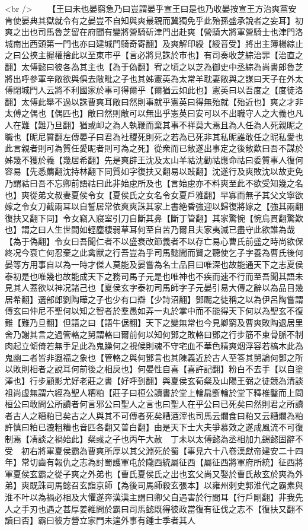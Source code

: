 <br />
　　【王曰未也晏窮急乃曰豈謂晏乎宣王曰是也乃收晏按宣王方治爽黨安肯使晏典其獄就令有之晏豈不自知與爽最親而冀獨免乎此殆孫盛承說者之妄耳】初爽之出也司馬魯芝留在府聞有變將營騎斫津門出赴爽【營騎大將軍營騎士也津門洛城南出西頭第一門也亦曰建城門騎奇寄翻】及爽解印綬【綬音受】將出主簿楊綜止之曰公挾主握權捨此以至東市乎【言必將見誅於市也】有司奏收芝綜治罪【治直之翻】太傅懿曰彼各為其主也【為于偽翻】宥之頃之以芝為御史中丞綜為尚書郎魯芝將出呼參軍辛敞欲與俱去敞毗之子也其姊憲英為太常羊耽妻敞與之謀曰天子在外太傅閉城門人云將不利國家於事可得爾乎【爾猶云如此也】憲英曰以吾度之【度徒洛翻】太傅此舉不過以誅曹爽耳敞曰然則事就乎憲英曰得無殆就【殆近也】爽之才非太傅之偶也【偶匹也】敞曰然則敞可以無出乎憲英曰安可以不出職守人之大義也凡人在難【難乃旦翻】猶或卹之為人執鞭而棄其事不祥莫大焉且為人任為人死親昵之職也【昵尼質翻左傳晏子曰君為社稷死則死之若為已死非其私昵誰敢任之昵私愛也此言親者則可為質任愛昵者則可為之死】從衆而已敞遂出事定之後敞歎曰吾不謀於姊幾不獲於義【幾居希翻】先是爽辟王沈及太山羊祜沈勸祜應命祜曰委質事人復何容易【先悉薦翻沈持林翻下同質如字復扶又翻易以䜴翻】沈遂行及爽敗沈以故吏免乃謂祜曰吾不忘卿前語祜曰此非始慮所及也【言始慮亦不料爽至此不欲受知幾之名也】爽從弟文叔妻夏侯令女【夏侯氏之女名令女夏戶雅翻】早寡而無子其父文寧欲嫁之令女刀截兩耳以自誓居常依爽爽誅其家上書絶昏強迎以歸復將嫁之【強其兩翻復扶又翻下同】令女竊入寢室引刀自斷其鼻【斷丁管翻】其家驚惋【惋烏貫翻驚歎也】謂之曰人生世間如輕塵棲弱草耳何至自苦乃爾且夫家夷滅已盡守此欲誰為哉【為于偽翻】令女曰吾聞仁者不以盛衰改節義者不以存亡易心曹氏前盛之時尚欲保終况今衰亡何忍棄之此禽獸之行吾豈為乎司馬懿聞而賢之聽使乞子字養為曹氏後何晏等方用事自以為一時才傑人莫能及晏嘗為名士品目曰唯深也故能通天下之志夏侯泰初是也唯幾也故能成天下之務司馬子元是也唯神也不疾而速不行而至吾聞其語未見其人蓋欲以神况諸己也【夏侯玄字泰初司馬師字子元晏引易大傳之辭以為品目幾居希翻】選部郎劉陶曄之子也少有口辯【少詩沼翻】鄧颺之徒稱之以為伊呂陶嘗謂傳玄曰仲尼不聖何以知之智者於羣愚如弄一丸於掌中而不能得天下何以為聖玄不復難【難乃旦翻】但語之曰【語牛倨翻】天下之變無常也今見卿窮及曹爽敗陶退居里舍乃謝其言之過管輅之舅謂輅曰爾前何以知何鄧之敗輅曰鄧之行步筋不束骨脈不制肉起立傾倚若無手足此為鬼躁何之視候則魂不守宅血不華色精爽烟浮容若槁木此為鬼幽二者皆非遐福之象也【管輅之與何鄧言也其陳義近於古人至答其舅論何鄧之所以敗則相者之說耳何前後之相戾也】何晏性自喜【喜許記翻】粉白不去手【以自塗澤也】行步顧影尤好老莊之書【好呼到翻】與夏侯玄荀粲及山陽王弼之徒競為清談祖尚虚無謂六經為聖人糟粕【莊子曰桓公讀書於堂上輪扁斵輪於堂下釋椎鑿而上問桓公曰敢問公所讀者何言邪公曰聖人之言也曰聖人在乎公曰已死矣曰然則君之所讀者古人之糟粕已矣古之人與其不可傳者死矣糟酒滓也司馬云爛食曰粕又云糟爛為粕許慎曰粕已漉粗糟也音匹各翻又普白翻】由是天下士大夫爭慕效之遂成風流不可復制焉【凊談之禍始此】粲彧之子也丙午大赦　丁未以太傅懿為丞相加九錫懿固辭不受　初右將軍夏侯霸為曹爽所厚以其父淵死於蜀【事見六十八卷漢獻帝建安二十四年】常切齒有報仇之志為討蜀護軍屯於隴西統屬征西【屬征西將軍府所統】征西將軍夏侯玄霸之從子爽之外弟也【曹氏夏侯氏之出也玄父尚又娶於曹氏故玄於爽為外弟】爽既誅司馬懿召玄詣京師【為後司馬師殺玄張本】以雍州刺史郭淮代之霸素與淮不叶以為禍必相及大懼遂奔漢漢主謂曰卿父自遇害於行間耳【行戶剛翻】非我先人之手刃也遇之甚厚姜維問於霸曰司馬懿既得彼政當復有征伐之志不【復扶又翻不讀曰否】霸曰彼方營立家門未遑外事有鍾士季者其人